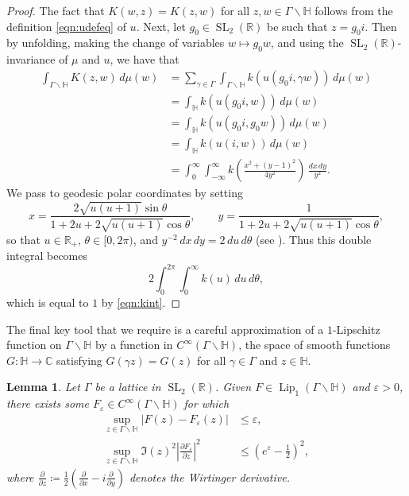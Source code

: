 \documentclass[11pt,a4paper]{amsart}
\newcommand{\C}{\mathbb{C}}
\newcommand{\dee}{\partial}
\newcommand{\e}{\varepsilon}
\newcommand{\Hb}{\mathbb{H}}
\newcommand{\R}{\mathbb{R}}
\DeclareMathOperator{\Lip}{Lip}
\DeclareMathOperator{\SL}{SL}
\numberwithin{equation}{section}
\newtheorem{lemma}[equation]{Lemma}
\theoremstyle{remark}
\theoremstyle{definition}
\begin{document}
\begin{proof}
The fact that $K(w,z) = K(z,w)$ for all $z,w \in \Gamma \backslash \Hb$ follows from the definition \eqref{eqn:udefeq} of $u$. Next, let $g_0 \in \SL_2(\R)$ be such that $z = g_0 i$. Then by unfolding, making the change of variables $w \mapsto g_0 w$, and using the $\SL_2(\R)$-invariance of $\mu$ and $u$, we have that
\begin{align*}
\int_{\Gamma \backslash \Hb} K(z,w) \, d\mu(w) & = \sum_{\gamma \in \Gamma} \int_{\Gamma \backslash \Hb} k(u(g_0 i,\gamma w)) \, d\mu(w)	\\
& = \int_{\Hb} k(u(g_0 i,w)) \, d\mu(w)	\\
& = \int_{\Hb} k(u(g_0 i, g_0 w)) \, d\mu(w)	\\
& = \int_{\Hb} k(u(i,w)) \, d\mu(w)	\\
& = \int_{0}^{\infty} \int_{-\infty}^{\infty} k\left(\frac{x^2 + (y - 1)^2}{4y^2}\right) \, \frac{dx \, dy}{y^2}.
\end{align*}
We pass to geodesic polar coordinates by setting
\begin{equation}
\label{eqn:geodesicpolar}
x = \frac{2 \sqrt{u(u + 1)} \sin \theta}{1 + 2u + 2 \sqrt{u(u + 1)} \cos \theta}, \qquad y = \frac{1}{1 + 2u + 2 \sqrt{u(u + 1)} \cos \theta},
\end{equation}
so that $u \in \R_+$, $\theta \in [0,2\pi)$, and $y^{-2} \, dx \, dy = 2 \, du \, d\theta$ (see \cite[Section 1.3]{Iwa02}). Thus this double integral becomes
\[2 \int_{0}^{2\pi} \int_{0}^{\infty} k(u) \, du \, d\theta,\]
which is equal to $1$ by \eqref{eqn:kint}.
\end{proof}

The final key tool that we require is a careful approximation of a $1$-Lipschitz function on $\Gamma \backslash \Hb$ by a function in $C^{\infty}(\Gamma \backslash \Hb)$, the space of smooth functions $G : \Hb \to \C$ satisfying $G(\gamma z) = G(z)$ for all $\gamma \in \Gamma$ and $z \in \Hb$.

\begin{lemma}
\label{lem:smoothing}
Let $\Gamma$ be a lattice in $\SL_2(\R)$. Given $F \in \Lip_1(\Gamma \backslash \Hb)$ and $\e > 0$, there exists some $F_{\e} \in C^{\infty}(\Gamma \backslash \Hb)$ for which
\begin{align}
\label{eqn:Fesup}
\sup_{z \in \Gamma \backslash \Hb} |F(z) - F_{\e}(z)| & \leq \e,	\\
\label{eqn:nablaFesup}
\sup_{z \in \Gamma \backslash \Hb} \Im(z)^2 \left|\frac{\dee F_{\e}}{\dee z}\right|^2 & \leq \left(e^{\e} - \frac{1}{2}\right)^2,
\end{align}
where $\frac{\dee}{\dee z} \coloneqq \frac{1}{2} (\frac{\dee}{\dee x} - i \frac{\dee}{\dee y})$ denotes the Wirtinger derivative.
\end{lemma}
\end{document}
